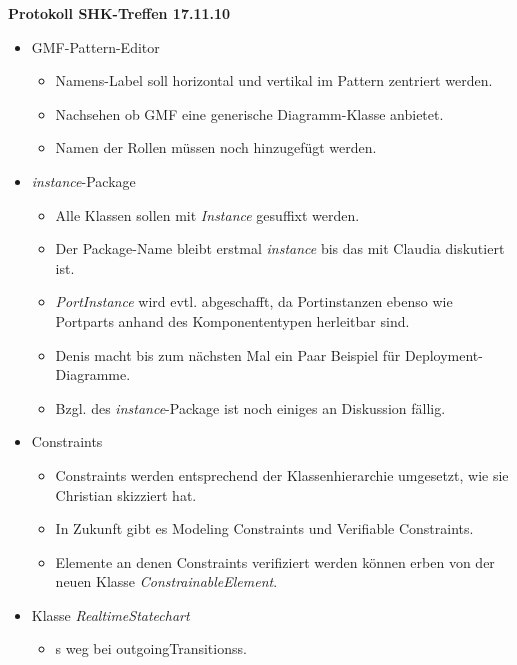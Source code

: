 \documentclass[11pt,a4paper]{article}
\begin{document}
\begin{center}

\textbf{\huge Protokoll SHK-Treffen 17.11.10}\\[0.9cm]

\end{center}

\begin{itemize}
  \item GMF-Pattern-Editor
  \begin{itemize}
    \item Namens-Label soll horizontal und vertikal im Pattern zentriert werden.
    \item Nachsehen ob GMF eine generische Diagramm-Klasse anbietet.
    \item Namen der Rollen müssen noch hinzugefügt werden.
  \end{itemize}
  \item \emph{instance}-Package
  \begin{itemize}
    \item Alle Klassen sollen mit \emph{Instance} gesuffixt werden.
    \item Der Package-Name bleibt erstmal \emph{instance} bis das mit Claudia
    diskutiert ist.
    \item \emph{PortInstance} wird evtl. abgeschafft, da Portinstanzen ebenso
    wie Portparts anhand des Komponententypen herleitbar sind.
    \item Denis macht bis zum nächsten Mal ein Paar Beispiel für
    Deployment-Diagramme.
    \item Bzgl. des \emph{instance}-Package ist noch einiges an Diskussion
    fällig.
  \end{itemize}
  \item Constraints
    \begin{itemize}
      \item Constraints werden entsprechend der Klassenhierarchie umgesetzt, wie
      sie Christian skizziert hat.
      \item In Zukunft gibt es Modeling Constraints und Verifiable Constraints.
      \item Elemente an denen Constraints verifiziert werden können erben von
      der neuen Klasse \emph{ConstrainableElement}.
    \end{itemize}
  \item Klasse \emph{RealtimeStatechart}
    \begin{itemize}
      \item s weg bei outgoingTransitionss.

\end{itemize}
\end{itemize}
\end{document}
